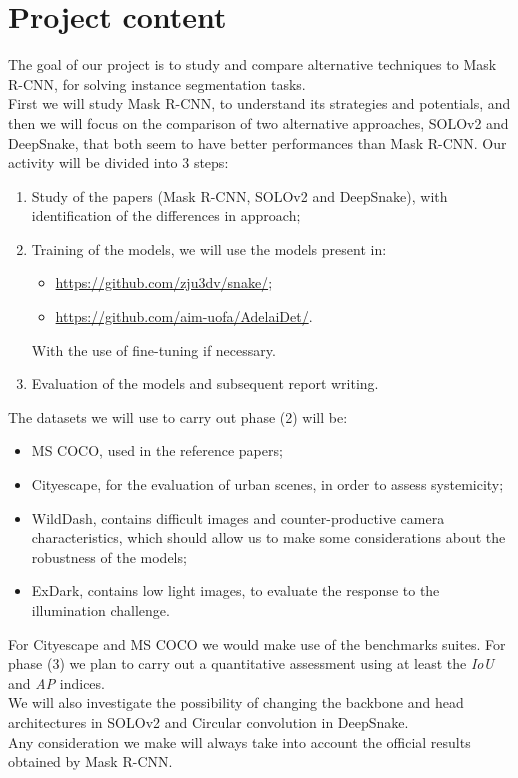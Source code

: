 
\section*{Project content}
The goal of our project is to study and compare alternative techniques to Mask R-CNN, for solving instance segmentation tasks.\\
First we will study Mask R-CNN, to understand its strategies and potentials, and then we will focus on the comparison of two alternative approaches, SOLOv2 and DeepSnake, that both seem to have better performances than Mask R-CNN. Our activity will be divided into 3 steps:
\begin{enumerate}
\item Study of the papers (Mask R-CNN, SOLOv2 and DeepSnake), with identification of the differences in approach;
\item Training of the models, we will use the models present in:
\begin{itemize}
\item \url{https://github.com/zju3dv/snake/};
\item \url{https://github.com/aim-uofa/AdelaiDet/}.
\end{itemize}
\noindent
With the use of fine-tuning if necessary.
\item Evaluation of the models and subsequent report writing.
\end{enumerate}
\noindent
The datasets we will use to carry out phase (2) will be:
\begin{itemize}
\item MS COCO, used in the reference papers;
\item Cityescape, for the evaluation of urban scenes, in order to assess systemicity;
\item WildDash, contains difficult images and counter-productive camera characteristics, which should allow us to make some considerations about the robustness of the models;
\item ExDark, contains low light images, to evaluate the response to the illumination challenge.
\end{itemize}
\noindent
For Cityescape and MS COCO we would make use of the benchmarks suites.
For phase (3) we plan to carry out a quantitative assessment using at least the \textit{IoU} and \textit{AP} indices.\\
We will also investigate the possibility of changing the backbone and head architectures in SOLOv2 and Circular convolution in DeepSnake.\\
Any consideration we make will always take into account the official results obtained by Mask R-CNN.

